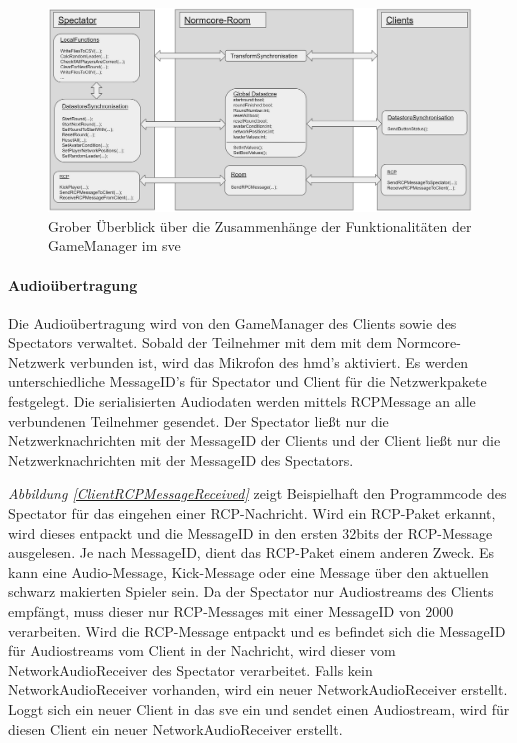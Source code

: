 \documentclass[a4paper,11pt]{article}%
\renewcommand{\\}{\vspace*{0.5\baselineskip} \newline}
\begin{document}
\begin{figure}[H]
		\begin{footnotesize}
		\centering
			\includegraphics[width=\textwidth]{Abbildungen/GameManagerClientSpectator.jpg}
			
			\caption[Abbildung 1]{Grober Überblick über die Zusammenhänge der Funktionalitäten der GameManager im \ac{sve}}
			\label{GameManagerClientSpectator}
		\end{footnotesize}
	\end{figure}

\paragraph{Audioübertragung}
Die Audioübertragung wird von den GameManager des Clients sowie des Spectators verwaltet. Sobald der Teilnehmer mit dem mit dem Normcore-Netzwerk verbunden ist, wird das Mikrofon des \ac{hmd}'s aktiviert. Es werden unterschiedliche MessageID's für Spectator und Client für die Netzwerkpakete festgelegt. Die serialisierten Audiodaten werden mittels RCPMessage an alle verbundenen Teilnehmer gesendet. Der Spectator ließt nur die Netzwerknachrichten mit der MessageID der Clients und der Client ließt nur die Netzwerknachrichten mit der MessageID des Spectators.

\textit{Abbildung \ref{ClientRCPMessageReceived}} zeigt Beispielhaft den Programmcode des Spectator für das eingehen einer RCP-Nachricht. Wird ein RCP-Paket erkannt, wird dieses entpackt und die MessageID in den ersten 32bits der RCP-Message ausgelesen. Je nach MessageID, dient das RCP-Paket einem anderen Zweck. Es kann eine Audio-Message, Kick-Message  oder eine Message über den aktuellen schwarz makierten Spieler sein. Da der Spectator nur Audiostreams des Clients empfängt, muss dieser nur RCP-Messages mit einer MessageID von \dq{}2000\dq{} verarbeiten. 
Wird die RCP-Message entpackt und es befindet sich die MessageID für Audiostreams vom Client  in der Nachricht, wird dieser vom \dq{}NetworkAudioReceiver\dq{} des Spectator verarbeitet.  Falls kein \dq{}NetworkAudioReceiver\dq{} vorhanden, wird ein neuer \dq{}NetworkAudioReceiver\dq{} erstellt. Loggt sich ein neuer Client in das \ac{sve} ein und sendet einen Audiostream, wird für diesen Client ein neuer \dq{}NetworkAudioReceiver\dq{} erstellt.
\end{document}
